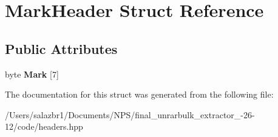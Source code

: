 \hypertarget{struct_mark_header}{\section{Mark\-Header Struct Reference}
\label{struct_mark_header}
}
\subsection*{Public Attributes}
\begin{DoxyCompactItemize}
\item 
\hypertarget{struct_mark_header_a879657ef67ef42dbfa01346f7afdab01}{byte {\bfseries Mark} \mbox{[}7\mbox{]}}\label{struct_mark_header_a879657ef67ef42dbfa01346f7afdab01}

\end{DoxyCompactItemize}


The documentation for this struct was generated from the following file\-:\begin{DoxyCompactItemize}
\item 
/\-Users/salazbr1/\-Documents/\-N\-P\-S/final\-\_\-unrarbulk\-\_\-extractor\-\_-\/26-\/12/code/headers.\-hpp\end{DoxyCompactItemize}
